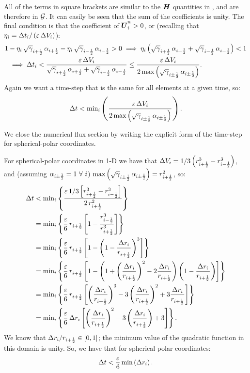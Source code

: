 \documentclass[10pt,preprint]{aastex}
\begin{document}
All of the terms in square brackets are similar to the $\boldsymbol{H}$ quantities in \citet{Qin2016}, and are therefore in $\mathcal{G}$. It can easily be seen that the sum of the coefficients is unity. The final condition is that the coefficient of $\overline{\boldsymbol{U}}^{n}_{i}>0$, or (recalling that $\eta_{i}=\Delta t_{i}/\left(\varepsilon\,\Delta V_{i}\right)$):
\begin{align}
    1&-\eta_{i}\,\sqrt{\gamma}_{i+\frac{1}{2}}\,\alpha_{i+\frac{1}{2}}-\eta_{i}\,\sqrt{\gamma}_{i-\frac{1}{2}}\,\alpha_{i-\frac{1}{2}}>0\implies\eta_{i}\left(\sqrt{\gamma}_{i+\frac{1}{2}}\,\alpha_{i+\frac{1}{2}}+\sqrt{\gamma}_{i-\frac{1}{2}}\,\alpha_{i-\frac{1}{2}}\right)<1\\
    &\implies\Delta t_{i}<\frac{\varepsilon\,\Delta V_{i}}{\sqrt{\gamma}_{i+\frac{1}{2}}\,\alpha_{i+\frac{1}{2}}+\sqrt{\gamma}_{i-\frac{1}{2}}\,\alpha_{i-\frac{1}{2}}}\leq\frac{\varepsilon\,\Delta V_{i}}{2\,\text{max}\left(\sqrt{\gamma}_{i\pm\frac{1}{2}}\,\alpha_{i\pm\frac{1}{2}}\right)}.
\end{align}
Again we want a time-step that is the same for all elements at a given time, so:
\begin{equation}
    \Delta t<\text{min}_{i}\left(\frac{\varepsilon\,\Delta V_{i}}{2\,\text{max}\left(\sqrt{\gamma}_{i\pm\frac{1}{2}}\,\alpha_{i\pm\frac{1}{2}}\right)}\right).
\end{equation}

We close the numerical flux section by writing the explicit form of the time-step for spherical-polar coordinates.

For spherical-polar coordinates in 1-D we have that $\Delta V_{i}=1/3\left(r_{i+\frac{1}{2}}^{3}-r_{i-\frac{1}{2}}^{3}\right)$, and (assuming $\alpha_{i\pm\frac{1}{2}}=1\ \forall\ i$) $\text{max}\left(\sqrt{\gamma}_{i\pm\frac{1}{2}}\,\alpha_{i\pm\frac{1}{2}}\right)=r_{i+\frac{1}{2}}^{2}$, so:
\begin{align}
    \Delta t&<\text{min}_{i}\left\{\frac{\varepsilon\,1/3\left[r_{i+\frac{1}{2}}^{3}-r_{i-\frac{1}{2}}^{3}\right]}{2\,r_{i+\frac{1}{2}}^{2}}\right\}\\
    &=\text{min}_{i}\left\{\frac{\varepsilon}{6}\,r_{i+\frac{1}{2}}\left[1-\frac{r_{i-\frac{1}{2}}^{3}}{r_{i+\frac{1}{2}}^{3}}\right]\right\}\\
    &=\text{min}_{i}\left\{\frac{\varepsilon}{6}\,r_{i+\frac{1}{2}}\left[1-\left(1-\frac{\Delta r_{i}}{r_{i+\frac{1}{2}}}\right)^{3}\right]\right\}\\
    &=\text{min}_{i}\left\{\frac{\varepsilon}{6}\,r_{i+\frac{1}{2}}\left[1-\left(1+\left(\frac{\Delta r_{i}}{r_{i+\frac{1}{2}}}\right)^{2}-2\frac{\Delta r_{i}}{r_{i+\frac{1}{2}}}\right)\left(1-\frac{\Delta r_{i}}{r_{i+\frac{1}{2}}}\right)\right]\right\}\\
    &=\text{min}_{i}\left\{\frac{\varepsilon}{6}\,r_{i+\frac{1}{2}}\left[\left(\frac{\Delta r_{i}}{r_{i+\frac{1}{2}}}\right)^{3}-3\left(\frac{\Delta r_{i}}{r_{i+\frac{1}{2}}}\right)^{2}+3\frac{\Delta r_{i}}{r_{i+\frac{1}{2}}}\right]\right\}\\
    &=\text{min}_{i}\left\{\frac{\varepsilon}{6}\,\Delta r_{i}\left[\left(\frac{\Delta r_{i}}{r_{i+\frac{1}{2}}}\right)^{2}-3\left(\frac{\Delta r_{i}}{r_{i+\frac{1}{2}}}\right)+3\right]\right\}.
\end{align}
We know that $\Delta r_{i}/r_{i+\frac{1}{2}}\in\left[0,1\right]$; the minimum value of the quadratic function in this domain is unity. So, we have that for spherical-polar coordinates:
\begin{equation}
\Delta t<\frac{\varepsilon}{6}\,\text{min}\left(\Delta r_{i}\right).
\end{equation}
\end{document}
